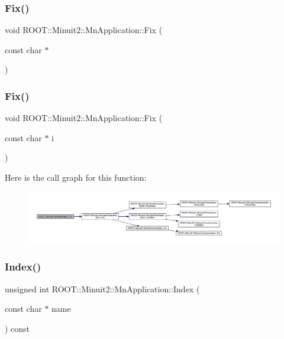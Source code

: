 \subsubsection{\texorpdfstring{Fix()}{Fix()}\hspace{0.1cm}{\footnotesize\ttfamily [3/4]}}
{\footnotesize\ttfamily void R\+O\+O\+T\+::\+Minuit2\+::\+Mn\+Application\+::\+Fix (\begin{DoxyParamCaption}\item[{const char $\ast$}]{ }\end{DoxyParamCaption})}

\mbox{\label{classROOT_1_1Minuit2_1_1MnApplication_aa678010fc292b1d0f4cb1761b13104c4}} 
\subsubsection{\texorpdfstring{Fix()}{Fix()}\hspace{0.1cm}{\footnotesize\ttfamily [4/4]}}
{\footnotesize\ttfamily void R\+O\+O\+T\+::\+Minuit2\+::\+Mn\+Application\+::\+Fix (\begin{DoxyParamCaption}\item[{const char $\ast$}]{i }\end{DoxyParamCaption})}

Here is the call graph for this function\+:\nopagebreak
\begin{figure}[H]
\begin{center}
\leavevmode
\includegraphics[width=350pt]{df/dd5/classROOT_1_1Minuit2_1_1MnApplication_aa678010fc292b1d0f4cb1761b13104c4_cgraph}
\end{center}
\end{figure}
\mbox{\label{classROOT_1_1Minuit2_1_1MnApplication_a6b6e2bc386692b9e3cd8a9ad01fc175e}} 
\subsubsection{\texorpdfstring{Index()}{Index()}\hspace{0.1cm}{\footnotesize\ttfamily [1/2]}}
{\footnotesize\ttfamily unsigned int R\+O\+O\+T\+::\+Minuit2\+::\+Mn\+Application\+::\+Index (\begin{DoxyParamCaption}\item[{const char $\ast$}]{name }\end{DoxyParamCaption}) const}

